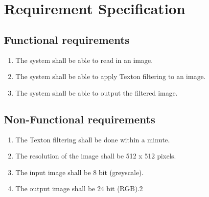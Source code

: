 \chapter{Requirement Specification}


\section{Functional requirements}
\begin{enumerate}[label=1.\arabic*]
	\item The system shall be able to read in an image.
	\item The system shall be able to apply Texton filtering to an image.
	\item The system shall be able to output the filtered image.
\end{enumerate}


\section{Non-Functional requirements}
\begin{enumerate}[label=2.\arabic*]
	\item The Texton filtering shall be done within a minute.
	\item The resolution of the image shall be 512 x 512 pixels.
	\item The input image shall be 8 bit (greyscale).
	\item The output image shall be 24 bit (RGB).2
\end{enumerate}